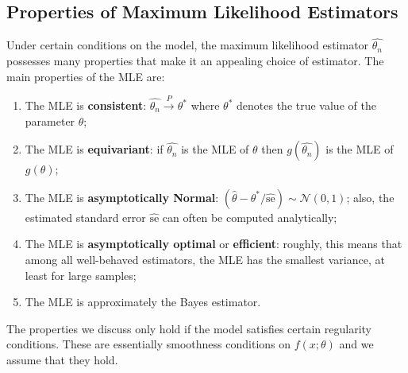 \documentclass[twoside]{article}
\begin{document}
\subsection{Properties of Maximum Likelihood Estimators}
Under certain conditions on the model, the maximum likelihood estimator $\hat{\theta_n}$ possesses many properties that make it an appealing choice of estimator. The main properties of the MLE are:
\begin{enumerate}
    \item The MLE is \textbf{consistent}: $\hat{\theta_n} \overset{P}{\to} \theta^*$ where $\theta^*$ denotes the true value of the parameter $\theta$;
    \item The MLE is \textbf{equivariant}: if $\hat{\theta_n}$ is the MLE of $\theta$ then $g(\hat{\theta_n})$ is the MLE of $g(\theta)$;
    \item  The MLE is \textbf{asymptotically Normal}: $(\hat{\theta} - \theta^* / \hat{\text{se}}) \sim \mathcal{N}(0, 1)$; also, the
estimated standard error $\hat{\text{se}}$ can often be computed analytically;
    \item The MLE is \textbf{asymptotically optimal} or \textbf{efficient}: roughly, this means that among all well-behaved estimators, the MLE has the smallest variance, at least for large samples;
    \item The MLE is approximately the Bayes estimator. 
\end{enumerate}
The properties we discuss only hold if the model satisfies certain regularity conditions. These are essentially smoothness conditions on $f(x; \theta)$ and we assume that they hold.
\end{document}
